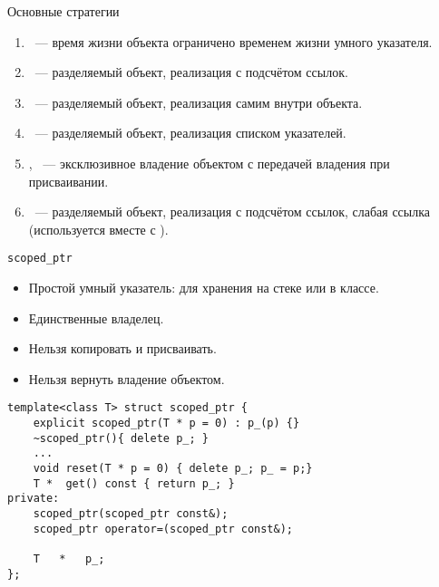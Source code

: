 \documentclass{beamer}
\begin{document}
\begin{frame}[fragile]{Основные стратегии}
    \begin{enumerate}
        \item {}~--- время жизни объекта ограничено временем
            жизни умного указателя.
        \item {}~--- разделяемый объект, реализация с подсчётом
            ссылок.
        \item {}~--- разделяемый объект, реализация самим
            внутри объекта.
        \item {}~--- разделяемый объект, реализация списком
            указателей.
        \item {}, ~--- эксклюзивное владение
            объектом с передачей владения при присваивании. 
        \item {}~--- разделяемый объект, реализация с подсчётом
            ссылок, слабая ссылка (используется вместе с ).
    \end{enumerate}
\end{frame}


\begin{frame}[fragile]{\texttt{scoped\_ptr}}
\small
\begin{itemize}
    \item Простой умный указатель: для хранения на стеке или в классе.
    \item Единственные владелец.
    \item Нельзя копировать и присваивать.
    \item Нельзя вернуть владение объектом.
\end{itemize}

    \begin{lstlisting}
template<class T> struct scoped_ptr {
    explicit scoped_ptr(T * p = 0) : p_(p) {}
    ~scoped_ptr(){ delete p_; }
    ...
    void reset(T * p = 0) { delete p_; p_ = p;}
    T *  get() const { return p_; }
private:
    scoped_ptr(scoped_ptr const&);
    scoped_ptr operator=(scoped_ptr const&); 

    T   *   p_;
};
    \end{lstlisting}
\end{frame}
\end{document}
